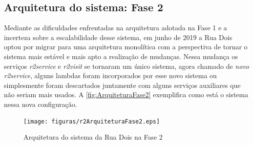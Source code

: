 %


\subsection{Arquitetura do sistema: Fase 2}

Mediante as dificuldades enfrentadas na arquitetura adotada na Fase 1 e a
incerteza sobre a escalabilidade desse sistema, em junho de 2019 a Rua Dois
optou por migrar para uma arquitetura monolítica com a perspectiva de tornar
o sistema mais estável e mais apto a realização de mudanças. Nessa mudança
os serviços \textit{r2service} e \textit{r2visit} se tornaram um único sistema,
agora chamado de \textit{novo r2service}, alguns lambdas foram incorporados por
esse novo sistema ou simplesmente foram descartados juntamente com alguns
serviços auxiliares que não seriam mais usados. A \autoref{fig:ArquiteturaFase2}
exemplifica como está o sistema nessa nova configuração.

\begin{figure}[h]
  \centering
  \caption{Arquitetura do sistema da Rua Dois na Fase 2\label{fig:ArquiteturaFase2}}
  \texttt{[image: figuras/r2ArquiteturaFase2.eps]}
\end{figure}
